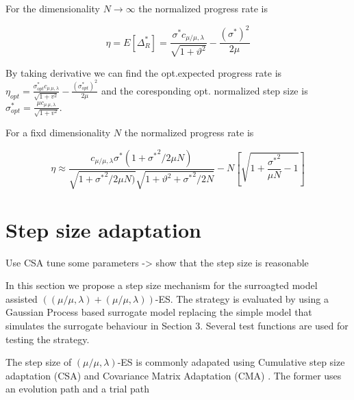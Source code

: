 
For the dimensionality $N \rightarrow \infty$ the normalized progress rate \cite{1284729} is 

$$
\eta = E[ \Delta_R^*] = \frac{\sigma^* c_{\mu / \mu, \lambda}}{\sqrt {1+ \vartheta^2}} - \frac{(\sigma^*)^2}{2 \mu}
$$

By taking derivative we can find the opt.expected progress rate is $\eta_{opt} = \frac{\sigma^*_{opt} c_{\mu \ \mu, \lambda}}{\sqrt {1+ v^2}} - \frac{(\sigma^*_{opt})^2}{2 \mu}$ and the coresponding opt. normalized step size is $\sigma^*_{opt} = \frac{ \mu c_{\mu \ \mu, \lambda}}{\sqrt {1+ v^2}} $.


For a fixd dimensionality $N$ the normalized progress rate \cite{ARNOLD2002629} is 


$$
\eta \approx \frac{c_{\mu/\mu,\lambda} \sigma^* (1+{\sigma^*}^2 /2\mu N)}{\sqrt{ 1+{\sigma^*}^2 /2\mu N) } \sqrt{ 1+ \vartheta^2 +{\sigma^*}^2 /2N }} - N \left [ \sqrt{1+ \frac{ {\sigma^*}^2 }{\mu N} - 1} \right ] 
$$

\section{Step size adaptation}


Use CSA tune some parameters -> show that the step size is reasonable

In this section we propose a step size mechanism for the surroagted model assisted $((\mu/\mu,\lambda)+(\mu/\mu,\lambda))$-ES.  The strategy is evaluated by using a Gaussian Process based surrogate model replacing the simple model that simulates the surrogate behaviour in Section 3. Several test functions are used for testing the strategy.

The step size of $(\mu/\mu,\lambda)$-ES is commonly adapated using Cumulative step size adaptation (CSA) \cite{Ostermeier:1994:DAS:1326675.1326679} and Covariance Matrix Adaptation (CMA) \cite{Hansen:2003:RTC:772374.772376}. The former uses an evolution path and a trial path 



